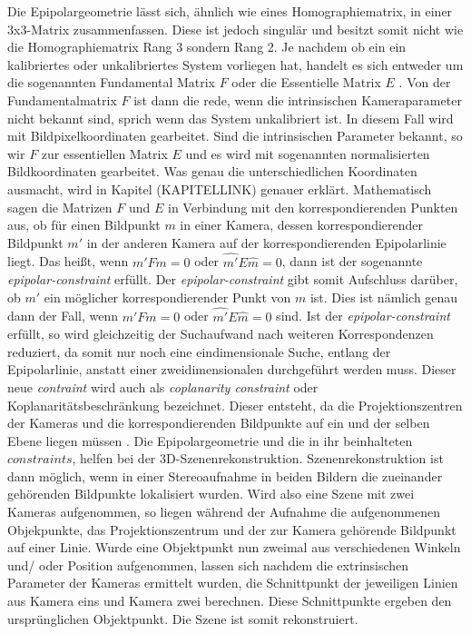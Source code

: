 Die Epipolargeometrie lässt sich, ähnlich wie eines Homographiematrix, in einer 3x3-Matrix zusammenfassen. Diese ist jedoch singulär und besitzt somit nicht wie die Homographiematrix Rang 3 sondern Rang 2. Je nachdem ob ein ein kalibriertes oder unkalibriertes System vorliegen hat, handelt es sich entweder um die sogenannten Fundamental Matrix $F$ oder die Essentielle Matrix $E$ \cite{Elements,HZ,ZZPaper,Zhang2014,ZZGXr}. Von der Fundamentalmatrix $F$ ist dann die rede, wenn die intrinsischen Kameraparameter nicht bekannt sind, sprich wenn das System unkalibriert ist. In diesem Fall wird mit Bildpixelkoordinaten gearbeitet. Sind die intrinsischen Parameter bekannt, so wir $F$ zur essentiellen Matrix $E$ und es wird mit sogenannten normalisierten Bildkoordinaten gearbeitet\cite{ZZPaper}. Was genau die unterschiedlichen Koordinaten ausmacht, wird in Kapitel (KAPITELLINK) genauer erklärt. Mathematisch sagen die Matrizen $F$ und $E$ in Verbindung mit den korrespondierenden Punkten aus, ob für einen Bildpunkt $m$ in einer Kamera, dessen korrespondierender Bildpunkt $m'$ in der anderen Kamera auf der korrespondierenden Epipolarlinie liegt.  Das heißt, wenn $m'Fm = 0$ oder $\hat{m'}E\hat{m}= 0$, dann ist der sogenannte \textit{epipolar-constraint} erfüllt. Der \textit{epipolar-constraint} gibt somit Aufschluss darüber, ob $m'$ ein möglicher korrespondierender Punkt von $m$ ist. Dies ist nämlich genau dann der Fall, wenn $m'Fm = 0$ oder $\hat{m'}E\hat{m}= 0$ sind\cite{HZ,Zhang2014}. Ist der \textit{epipolar-constraint} erfüllt, so wird gleichzeitig der Suchaufwand nach weiteren Korrespondenzen reduziert, da somit nur noch eine eindimensionale Suche, entlang der Epipolarlinie, anstatt einer zweidimensionalen durchgeführt werden muss. Dieser neue \textit{contraint} wird auch als \textit{coplanarity constraint} oder Koplanaritätsbeschränkung bezeichnet. Dieser entsteht, da die Projektionszentren der Kameras und die korrespondierenden Bildpunkte auf ein und der selben Ebene liegen müssen \cite{Zhang2014}. Die Epipolargeometrie und die in ihr beinhalteten $constraints$, helfen bei der 3D-Szenenrekonstruktion. Szenenrekonstruktion ist dann möglich, wenn in einer Stereoaufnahme in beiden Bildern die zueinander gehörenden Bildpunkte lokalisiert wurden. Wird also eine Szene mit zwei Kameras aufgenommen, so liegen während der Aufnahme die aufgenommenen Objekpunkte, das Projektionszentrum und der zur Kamera gehörende Bildpunkt auf einer Linie. Wurde eine Objektpunkt nun zweimal aus verschiedenen Winkeln und/ oder Position aufgenommen, lassen sich nachdem die extrinsischen Parameter der Kameras ermittelt wurden, die Schnittpunkt der jeweiligen Linien aus Kamera eins und Kamera zwei berechnen. Diese Schnittpunkte ergeben den ursprünglichen Objektpunkt. Die Szene ist somit rekonstruiert\cite{Elements,ZZGXr,HZ}. 


